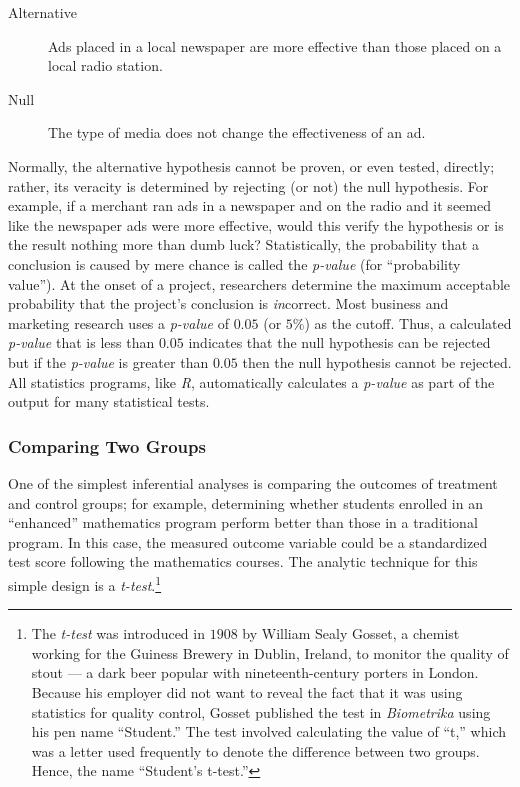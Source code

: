 \begin{description}
	\item[Alternative] Ads placed in a local newspaper are more effective than those placed on a local radio station.
	\item[Null] The type of media does not change the effectiveness of an ad.
\end{description}

Normally, the alternative hypothesis cannot be proven, or even tested, directly; rather, its veracity is determined by rejecting (or not) the null hypothesis. For example, if a merchant ran ads in a newspaper and on the radio and it seemed like the newspaper ads were more effective, would this verify the hypothesis or is the result nothing more than dumb luck? Statistically, the probability that a conclusion is caused by mere chance is called the \textit{p-value} (for ``probability value''). At the onset of a project, researchers determine the maximum acceptable probability that the project's conclusion is \textit{in}correct. Most business and marketing research uses a \textit{p-value} of $ 0.05 $ (or $ 5\% $) as the cutoff. Thus, a calculated \textit{p-value} that is less than $ 0.05 $ indicates that the null hypothesis can be rejected but if the \textit{p-value} is greater than $ 0.05 $ then the null hypothesis cannot be rejected. All statistics programs, like \textit{R}, automatically calculates a \textit{p-value} as part of the output for many statistical tests.

\subsubsection{Comparing Two Groups}

One of the simplest inferential analyses is comparing the outcomes of treatment and control groups; for example, determining whether students enrolled in an ``enhanced'' mathematics program perform better than those in a traditional program. In this case, the measured outcome variable could be a standardized test score following the mathematics courses. The analytic technique for this simple design is a \textit{t-test}.\footnote{The \textit{t-test} was introduced in $ 1908 $ by William Sealy Gosset, a chemist working for the Guiness Brewery in Dublin, Ireland, to monitor the quality of stout --- a dark beer popular with nineteenth-century porters in London. Because his employer did not want to reveal the fact that it was using statistics for quality control, Gosset published the test in \textit{Biometrika} using his pen name ``Student.'' The test involved calculating the value of ``t,'' which was a letter used frequently to denote the difference between two groups. Hence, the name ``Student's t-test.''}

